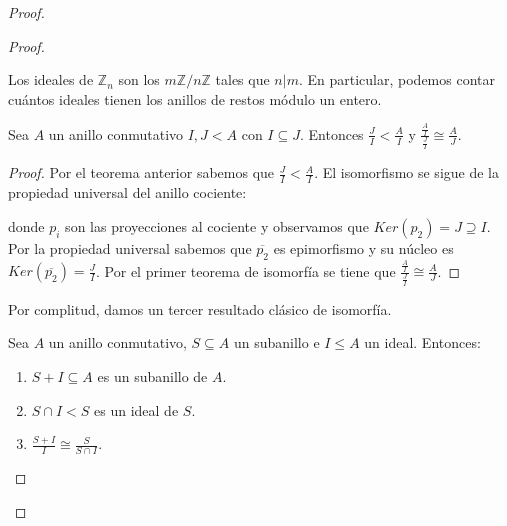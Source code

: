 \begin{proof}
\begin{proof}
\begin{example}
Los ideales de $\mathbb{Z}_n$ son los $m\mathbb{Z}/n\mathbb{Z}$ tales que $n|m$. En particular, podemos contar cuántos ideales tienen los anillos de restos módulo un entero. 
\end{example}

\begin{theorem}
	Sea $A$ un anillo conmutativo $I,J < A$ con $I \subseteq J$. Entonces $\frac{J}{I} < \frac{A}{I}$ y $\frac{\frac{A}{I}}{\frac{J}{I}} \cong \frac{A}{J}$.
\end{theorem}
\begin{proof}
Por el teorema anterior sabemos que $\frac{J}{I} < \frac{A}{I}$. El isomorfismo se sigue de la propiedad universal del anillo cociente:


donde $p_i$ son las proyecciones al cociente y observamos que $Ker(p_2) = J \supseteq I$. Por la propiedad universal sabemos que $\overline{p_2}$ es epimorfismo y su núcleo es $Ker(\overline{p_2}) = \frac{J}{I}$. Por el primer teorema de isomorfía se tiene que $\frac{\frac{A}{I}}{\frac{J}{I}} \cong \frac{A}{J}$.
\end{proof}

Por complitud, damos un tercer resultado clásico de isomorfía. 

\begin{theorem}
Sea $A$ un anillo conmutativo, $S \subseteq A$ un subanillo e $I \le A$ un ideal. Entonces:

\begin{enumerate}
\item $S+I \subseteq A$ es un subanillo de $A$. 
\item $S \cap I < S$ es un ideal de $S$. 
\item $\frac{S+I}{I} \cong \frac{S}{S \cap I}$. 
\end{enumerate}

\end{theorem}


\end{proof}
\end{proof}
